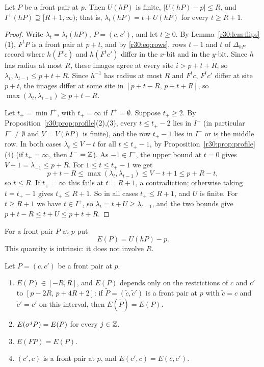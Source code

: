 \begin{lemma}\label{r30:lem:onset}
Let $P$ be a front pair at $p$. Then $U(hP)$ is finite, $|U(hP)-p|\le R$, and $I^+(hP)\supseteq[R+1,\infty)$; that is, $\lambda_t(hP)=t+U(hP)$ for every $t\ge R+1$.
\end{lemma}

\begin{proof}
Write $\lambda_t=\lambda_t(hP)$, $P=(c,c')$, and let $t\ge0$. By Lemma~\ref{r30:lem:flips}(1), $F^tP$ is a front pair at $p+t$, and by \eqref{r30:eq:rows}, rows $t-1$ and $t$ of $\Delta_{hP}$ record where $h(F^tc)$ and $h(F^tc')$ differ in the $x$-bit and in the $y$-bit. Since $h$ has radius at most $R$, these images agree at every site $i>p+t+R$, so $\lambda_t,\lambda_{t-1}\le p+t+R$. Since $h^{-1}$ has radius at most $R$ and $F^tc$, $F^tc'$ differ at site $p+t$, the images differ at some site in $[p+t-R,\,p+t+R]$, so $\max(\lambda_t,\lambda_{t-1})\ge p+t-R$.

Let $t_+=\min I^+$, with $t_+=\infty$ if $I^+=\emptyset$. Suppose $t_+\ge2$. By Proposition~\ref{r30:prop:profile}(2),(3), every $t\le t_+-2$ lies in $I^-$ (in particular $I^-\ne\emptyset$ and $V=V(hP)$ is finite), and the row $t_+-1$ lies in $I^-$ or is the middle row. In both cases $\lambda_t\le V-t$ for all $t\le t_+-1$, by Proposition~\ref{r30:prop:profile}(4) (if $t_+=\infty$, then $I^-=\mathbb{Z}$). As $-1\in I^-$, the upper bound at $t=0$ gives $V+1=\lambda_{-1}\le p+R$. For $1\le t\le t_+-1$ we get
\[
p+t-R\le\max(\lambda_t,\lambda_{t-1})\le V-t+1\le p+R-t,
\]
so $t\le R$. If $t_+=\infty$ this fails at $t=R+1$, a contradiction; otherwise taking $t=t_+-1$ gives $t_+\le R+1$. So in all cases $t_+\le R+1$, and $U$ is finite. For $t\ge R+1$ we have $t\in I^+$, so $\lambda_t=t+U\ge\lambda_{t-1}$, and the two bounds give $p+t-R\le t+U\le p+t+R$.
\end{proof}

For a front pair $P$ at $p$ put
\[
E(P)=U(hP)-p.
\]
This quantity is intrinsic: it does not involve $R$.

\begin{lemma}\label{r30:lem:E}
Let $P=(c,c')$ be a front pair at $p$.
\begin{enumerate}
\item $E(P)\in[-R,R]$, and $E(P)$ depends only on the restrictions of $c$ and $c'$ to $[p-2R,\,p+4R+2]$: if $\tilde P=(\tilde c,\tilde c')$ is a front pair at $p$ with $\tilde c=c$ and $\tilde c'=c'$ on this interval, then $E(\tilde P)=E(P)$.
\item $E(\sigma^jP)=E(P)$ for every $j\in\mathbb{Z}$.
\item $E(FP)=E(P)$.
\item $(c',c)$ is a front pair at $p$, and $E(c',c)=E(c,c')$.
\end{enumerate}
\end{lemma}

